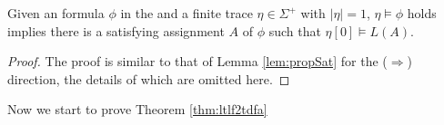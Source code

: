 \begin{corollary}\label{coro:propSat}
Given an \ltlf formula $\phi$ in the \XNF and a finite trace $\eta\in\Sigma^+$ with $|\eta|=1$, $\eta\models\phi$ holds implies there is a satisfying assignment $A$ of $\phi$ such that $\eta[0]\models L(A)$.
\end{corollary}
\begin{proof}
The proof is similar to that of Lemma \ref{lem:propSat} for the ($\Rightarrow$) direction, the details of which are omitted here.
\end{proof}

Now we start to prove Theorem \ref{thm:ltlf2tdfa}
\iffalse
\begin{theorem}
Given an \ltlf formula $\phi$ and the \TDFA ${\A_{\phi}}$ constructed by Definition \ref{def:ltlf2dfa}, a finite trace $\eta\models\phi$ holds iff $\eta$ is accepted by ${\A_{\phi}}$. 
\end{theorem}
\fi
